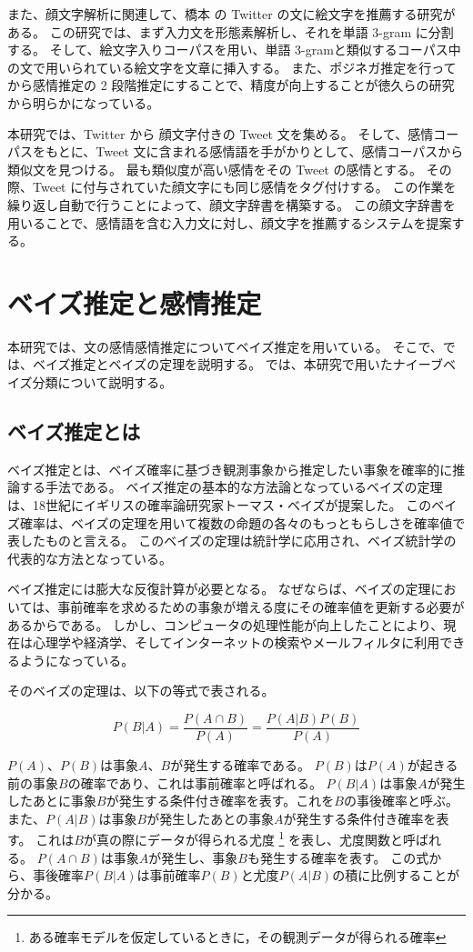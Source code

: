 \documentclass[11pt,a4j]{jsarticle}
\begin{document}
また、顔文字解析に関連して、橋本  の Twitter の文に絵文字を推薦する研究がある。
この研究では、まず入力文を形態素解析し、それを単語 3-gram に分割する。
そして、絵文字入りコーパスを用い、単語 3-gramと類似するコーパス中の文で用いられている絵文字を文章に挿入する。
また、ポジネガ推定を行ってから感情推定の 2 段階推定にすることで、精度が向上することが徳久らの研究 から明らかになっている。

本研究では、Twitter から 顔文字付きの Tweet 文を集める。
そして、感情コーパスをもとに、Tweet 文に含まれる感情語を手がかりとして、感情コーパスから類似文を見つける。
最も類似度が高い感情をその Tweet の感情とする。
その際、Tweet に付与されていた顔文字にも同じ感情をタグ付けする。
この作業を繰り返し自動で行うことによって、顔文字辞書を構築する。
この顔文字辞書を用いることで、感情語を含む入力文に対し、顔文字を推薦するシステムを提案する。

\section{ベイズ推定と感情推定}\label{sec:def}
本研究では、文の感情感情推定についてベイズ推定を用いている。
そこで、では、ベイズ推定とベイズの定理を説明する。
では、本研究で用いたナイーブベイズ分類について説明する。

  \subsection{ベイズ推定とは}\label{sec:defbayes}
ベイズ推定とは、ベイズ確率に基づき観測事象から推定したい事象を確率的に推論する手法である。
ベイズ推定の基本的な方法論となっているベイズの定理は、18世紀にイギリスの確率論研究家トーマス・ベイズが提案した。
このベイズ確率は、ベイズの定理を用いて複数の命題の各々のもっともらしさを確率値で表したものと言える。
このベイズの定理は統計学に応用され、ベイズ統計学の代表的な方法となっている。


ベイズ推定には膨大な反復計算が必要となる。
なぜならば、ベイズの定理においては、事前確率を求めるための事象が増える度にその確率値を更新する必要があるからである。
しかし、コンピュータの処理性能が向上したことにより、現在は心理学や経済学、そしてインターネットの検索やメールフィルタに利用できるようになっている。

そのベイズの定理は、以下の等式で表される。

\[
P(B|A)=\frac{P(A \cap B)}{P(A)}=\frac{P(A|B)P(B)}{P(A)}
\]


$P(A)$、$P(B)$は事象$A$、$B$が発生する確率である。
$P(B)$は$P(A)$が起きる前の事象$B$の確率であり、これは事前確率と呼ばれる。
$P(B|A)$は事象$A$が発生したあとに事象$B$が発生する条件付き確率を表す。これを$B$の事後確率と呼ぶ。
また、$P(A|B)$は事象$B$が発生したあとの事象$A$が発生する条件付き確率を表す。
これは$B$が真の際にデータが得られる尤度 \footnote{ある確率モデルを仮定しているときに，その観測データが得られる確率} を表し、尤度関数と呼ばれる。
$P(A \cap B)$は事象$A$が発生し、事象$B$も発生する確率を表す。
この式から、事後確率$P(B|A)$は事前確率$P(B)$と尤度$P(A|B)$の積に比例することが分かる。
\end{document}
